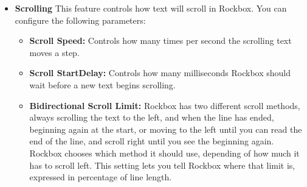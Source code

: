 \begin{itemize}
  \item \textbf{Scrolling}
    This feature controls how text will scroll in Rockbox. You can configure the following parameters:
    \begin{itemize}
    \item \textbf{Scroll Speed:} 
      Controls how many times per second the scrolling text moves a step.
    \item \textbf{Scroll StartDelay:} 
      Controls how many milliseconds Rockbox should wait before a new text begins scrolling.
    \item \textbf{Bidirectional Scroll Limit: }
      Rockbox has two different scroll methods,  always scrolling the text to the left, and when the line has ended, beginning again at the start, or moving to the left until you can read the end of the line, and scroll right until you see the beginning again. Rockbox chooses which method it should use, depending of how much it has to scroll left. This setting lets you tell Rockbox where that limit is, expressed in percentage of line length.
    \end{itemize}
    
    

\end{itemize}
